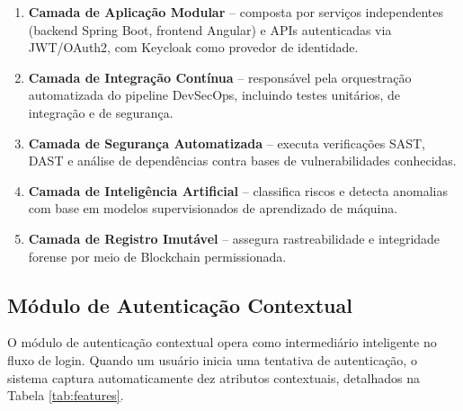 \documentclass[12pt,a4paper]{article}
\begin{document}
\begin{enumerate}
    \item \textbf{Camada de Aplicação Modular} -- composta por serviços independentes (backend Spring Boot, frontend Angular) e APIs autenticadas via JWT/OAuth2, com Keycloak como provedor de identidade.
    \item \textbf{Camada de Integração Contínua} -- responsável pela orquestração automatizada do pipeline DevSecOps, incluindo testes unitários, de integração e de segurança.
    \item \textbf{Camada de Segurança Automatizada} -- executa verificações SAST, DAST e análise de dependências contra bases de vulnerabilidades conhecidas.
    \item \textbf{Camada de Inteligência Artificial} -- classifica riscos e detecta anomalias com base em modelos supervisionados de aprendizado de máquina.
    \item \textbf{Camada de Registro Imutável} -- assegura rastreabilidade e integridade forense por meio de Blockchain permissionada.
\end{enumerate}


\subsection{Módulo de Autenticação Contextual}

O módulo de autenticação contextual opera como intermediário inteligente no fluxo de login. Quando um usuário inicia uma tentativa de autenticação, o sistema captura automaticamente dez atributos contextuais, detalhados na Tabela \ref{tab:features}.
\end{document}
